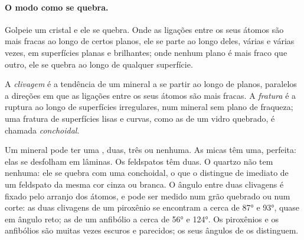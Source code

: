 \paragraph{O modo como se quebra.} Golpeie um cristal e ele se quebra. Onde
as ligações entre os seus átomos são mais fracas ao longo de certos planos,
ele se parte ao longo deles, várias e várias vezes, em superfícies planas e
brilhantes; onde nenhum plano é mais fraco que outro, ele se quebra ao longo
de qualquer superfície.

\begin{definition}\label{def:g11:minerals:cleavage}
A \emph{clivagem} é a tendência de um mineral
a se partir ao longo de planos, paralelos a direções em que as ligações
entre os seus átomos são mais fracas. A \emph{fratura}
é a ruptura ao longo de superfícies irregulares, num mineral sem plano de
fraqueza; uma fratura de superfícies lisas e curvas, como as de um vidro
quebrado, é chamada \emph{conchoidal}.
\end{definition}

Um mineral pode ter uma , duas, três ou nenhuma. As micas têm uma,
perfeita: elas se desfolham em lâminas. Os feldspatos têm duas. O quartzo
não tem nenhuma: ele se quebra com uma  conchoidal, o que o distingue
de imediato de um feldspato da mesma cor cinza ou branca. O ângulo entre
duas clivagens é fixado pelo arranjo dos átomos, e pode ser medido num grão
quebrado ou num corte: as duas clivagens de um piroxênio se encontram a
cerca de \ang{87} e \ang{93}, quase em ângulo reto; as de um anfibólio a
cerca de \ang{56} e \ang{124}. Os piroxênios e os anfibólios são muitas
vezes escuros e parecidos; os seus ângulos de  os distinguem.

